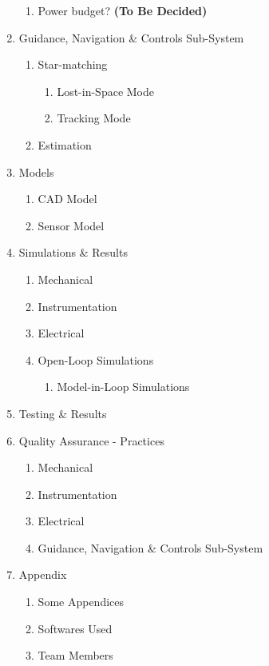 \documentclass[../../main.tex]{subfiles}
\begin{document}
\begin{enumerate}
\begin{enumerate}
        \item Power budget? \textbf{(To Be Decided)}
    \end{enumerate} 
    \item Guidance, Navigation \& Controls Sub-System
    \begin{enumerate}
        \item Star-matching
        \begin{enumerate}
            \item Lost-in-Space Mode
            \item Tracking Mode
        \end{enumerate}
        \item Estimation
    \end{enumerate}
    \item Models
    \begin{enumerate}
        \item CAD Model
        \item Sensor Model
    \end{enumerate}
    \item Simulations \& Results
    \begin{enumerate}
        \item Mechanical
        \item Instrumentation
        \item Electrical
        \item Open-Loop Simulations
        \begin{enumerate}
            \item Model-in-Loop Simulations
        \end{enumerate}
    \end{enumerate}
    \item Testing \& Results
    \item Quality Assurance - Practices
    \begin{enumerate}
        \item Mechanical
        \item Instrumentation
        \item Electrical
        \item Guidance, Navigation \& Controls Sub-System
    \end{enumerate}
    \item Appendix
    \begin{enumerate}
        \item Some Appendices
        \item Softwares Used
        \item Team Members
    \end{enumerate}
\end{enumerate}
\end{document}
